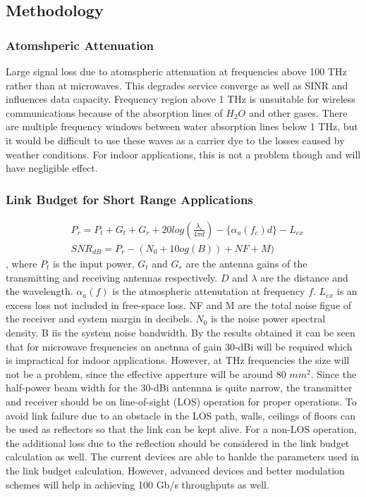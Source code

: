 \documentclass[12pt, letterpaper]{article}
\begin{document}
	\subsection{Methodology}
	\subsubsection{Atomshperic Attenuation}
	Large signal loss due to atomspheric attenuation at frequencies above 100 THz rather than at microwaves. This degrades service converge as well as SINR and influences data capacity. Frequency region above 1 THz is unsuitable for wireless communications because of the absorption lines of $H_2O$ and other gases. There are multiple frequency windows between water absorption lines below 1 THz, but it would be difficult to use these waves as a carrier dye to the losses caused by weather conditions. For indoor applications, this is not a problem though and will have negligible effect.
		\subsubsection{Link Budget for Short Range Applications}
		\begin{align*}
			&P_r = P_t + G_t + G_r + 20  log(\frac{\lambda_c}{4 \pi d}) - \{ \alpha_a (f_c) d\} - L_{ex} \\
			& SNR_{dB} = P_r - (N_0 + 10og(B)) + NF + M)
		\end{align*}, where $P_t$ is the input power, $G_t$ and $G_r$ are the antenna gains of the transmitting and receiving antennas respectively. $D$ and $\lambda$ are the distance and the wavelength. $\alpha_a(f)$ is the atmospheric attenutation at frequency $f$. $L_{ex}$ is an excess loss not included in free-space loss. NF and M are the total noise figue of the receiver and system margin in decibels. $N_0$ is the noise power spectral density. B iis the system noise bandwidth. By the results obtained it can be seen that for microwave frequencies an anetnna of gain 30-dBi will be required which is impractical for indoor applications. However, at THz frequencies the size will not be a problem, since the effective apperture will be around 80 $mm^2$. Since the half-power beam width for the 30-dBi antennna is quite narrow, the transmitter and receiver should be on line-of-sight (LOS) operation for proper operations. To avoid link failure due to an obstacle in the LOS path, walls, ceilings of floors can be used as reflectors so that the link can be kept alive. For a non-LOS operation, the additional loss due to the reflection should be considered in the link budget calculation as well. The current devices are able to hanlde the parameters used in the link budget calculation. However, advanced devices and better modulation schemes will help in achieving 100 Gb/s throughputs as well.
\end{document}
